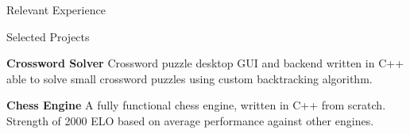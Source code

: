 \documentclass{resume}
\newcommand{\tab}[1]{\hspace{.2667\textwidth}\rlap{#1}}
\newcommand{\itab}[1]{\hspace{0em}\rlap{#1}}
\begin{document}
\begin{rSection}{Relevant Experience}

\end{rSection}




\begin{rSection}{Selected Projects} \itemsep -2pt
\item \textbf{Crossword Solver} Crossword puzzle desktop GUI and backend written in C++ able to solve small crossword puzzles using custom backtracking algorithm.
\item \textbf{Chess Engine} A fully functional chess engine, written in C++ from scratch. Strength of 2000 ELO based on average performance against other engines.


\end{rSection}

\end{document}
